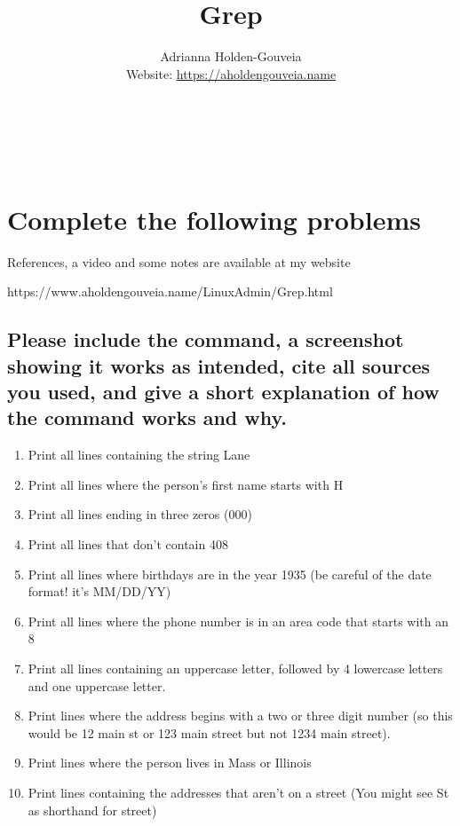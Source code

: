 \documentclass[12pt]{article}
\title{Grep}
\author{
        Adrianna Holden-Gouveia \\
        Website: \url{https://aholdengouveia.name}\\
        \date{\vspace{-5ex}} 
        \faLinkedin{: aholdengouveia} \\
        \faGithub {: aholdengouveia} \\
        \faTwitter {: aholdengouveia} \\
        }
\begin{document}
    

\maketitle


\section*{Complete the following problems}

References, a video and some notes are available at my website

https://www.aholdengouveia.name/LinuxAdmin/Grep.html

\subsection*{Please include the command, a screenshot showing it works as intended, cite all sources you used, and give a short explanation of how the command works and why.}
    \begin{enumerate}
        \item Print all lines containing the string Lane
        \item Print all lines where the person's first name starts with H
        \item Print all lines ending in three zeros (000)
        \item Print all lines that don't contain 408
        \item Print all lines where birthdays are in the year 1935 (be careful of the date format! it's MM/DD/YY)
        \item Print all lines where the phone number is in an area code that starts with an 8
        \item Print all lines containing an uppercase letter, followed by 4 lowercase letters and one uppercase letter.
        \item Print lines where the address begins with a two or three digit number (so this would be 12 main st or 123 main street but not 1234 main street).
        \item Print lines where the person lives in Mass or Illinois
        \item Print lines containing the addresses that aren't on a street (You might see St as shorthand for street)


    \end{enumerate}
\end{document}
